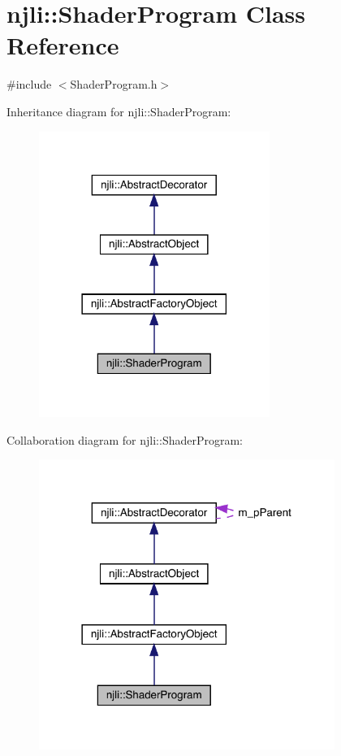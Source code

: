 \hypertarget{classnjli_1_1_shader_program}{}\section{njli\+:\+:Shader\+Program Class Reference}
\label{classnjli_1_1_shader_program}


{\ttfamily \#include $<$Shader\+Program.\+h$>$}



Inheritance diagram for njli\+:\+:Shader\+Program\+:\nopagebreak
\begin{figure}[H]
\begin{center}
\leavevmode
\includegraphics[width=213pt]{classnjli_1_1_shader_program__inherit__graph}
\end{center}
\end{figure}


Collaboration diagram for njli\+:\+:Shader\+Program\+:\nopagebreak
\begin{figure}[H]
\begin{center}
\leavevmode
\includegraphics[width=273pt]{classnjli_1_1_shader_program__coll__graph}
\end{center}
\end{figure}

